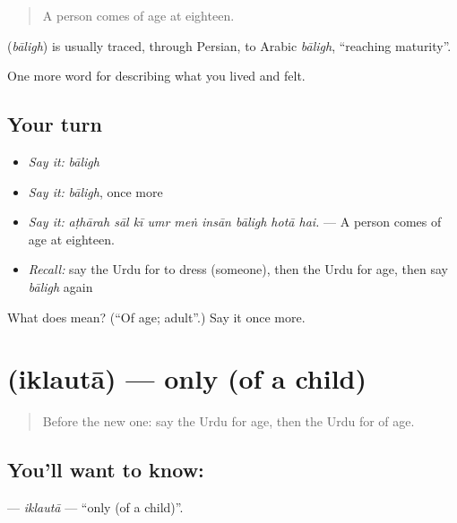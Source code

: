 \begin{quote}
A person comes of age at eighteen.
\end{quote}

\begin{cousinweb}
\textbf{} (\emph{bāligh}) is usually traced, through Persian, to Arabic \emph{bāligh}, \textquotedblleft{}reaching maturity\textquotedblright{}.
\end{cousinweb}

\begin{grammarlens}[title={What you've built}]
One more word for describing what you lived and felt.
\end{grammarlens}

\subsection*{Your turn}
\begin{itemize}
\raggedright
  \item \emph{Say it:} \emph{bāligh}
  \item \emph{Say it:} \emph{bāligh}, once more
  \item \emph{Say it:} \emph{aṭhārah sāl kī umr meṅ insān bāligh hotā hai.} — A person comes of age at eighteen.
  \item \emph{Recall:} say the Urdu for to dress (someone), then the Urdu for age, then say \emph{bāligh} again
\end{itemize}

\begin{tcolorbox}[breakable,colback=teal!4,colframe=teal!35!black,title={Before you move on}]
What does  mean? (\textquotedblleft{}Of age; adult\textquotedblright{}.) Say it once more.
\end{tcolorbox}
\section[\texorpdfstring{\ur{اکلوتا} (iklautā)}{اکلوتا (iklautā)}]{ (iklautā) — only (of a child)}

\label{lesson:UR-C486-iklauta}



\begin{quote}
Before the new one: say the Urdu for age, then the Urdu for of age.
\end{quote}

\subsection*{You'll want to know: }
\textbf{} — \emph{iklautā} — \textquotedblleft{}only (of a child)\textquotedblright{}.

